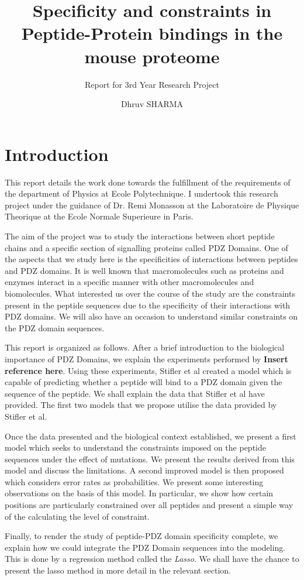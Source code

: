 \documentclass[a4paper, 12pt]{article}
\title{Specificity and constraints in Peptide-Protein bindings in the mouse proteome}
\subtitle{Report for 3rd Year Research Project}
\author{Dhruv SHARMA}
\begin{document}
\pagebreak
\maketitle
\tableofcontents
\pagebreak
\part{Introduction}
	This report details the work done towards the fulfillment of the requirements of the department of Physics at Ecole Polytechnique. I undertook this research project under the guidance of Dr. Remi Monasson at the Laboratoire de Physique Theorique at the Ecole Normale Superieure in Paris.

	The aim of the project was to study the interactions between short peptide chains and a specific section of signalling proteins called PDZ Domains. One of the aspects that we study here is the specificities of interactions between peptides and PDZ domains. It is well known that macromolecules such as proteins and enzymes interact in a specific manner with other macromolecules and biomolecules. What interested us over the course of the study are the constraints present in the peptide sequences due to the specificity of their interactions with PDZ domains. We will also have an occasion to understand similar constraints on the PDZ domain sequences. 

	This report is organized as follows. After a brief introduction to the biological importance of PDZ Domains, we explain the experiments performed by \textbf{Insert reference here}. Using these experiments, Stifler et al created a model which is capable of predicting whether a peptide will bind to a PDZ domain given the sequence of the peptide. We shall explain the data that Stifler et al have provided. The first two models that we propose utilise the data provided by Stifler et al. 

	Once the data presented and the biological context established, we present a first model which seeks to understand the constraints imposed on the peptide sequences under the effect of mutations. We present the results derived from this model and discuss the limitations. A second improved model is then proposed which considers error rates as probabilities. We present some interesting observations on the basis of this model. In particular, we show how certain positions are particularly constrained over all peptides and present a simple way of the calculating the level of constraint. 

	Finally, to render the study of peptide-PDZ domain specificity complete, we explain how we could integrate the PDZ Domain sequences into the modeling. This is done by a regression method called the \textit{Lasso}. We shall have the chance to present the lasso method in more detail in the relevant section. 
\end{document}
